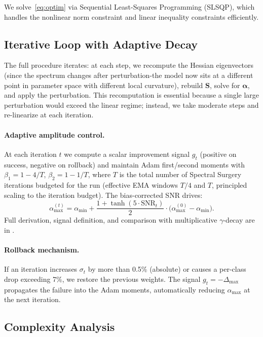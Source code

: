 \documentclass[11pt,a4paper]{article}
\newcommand{\mat}[1]{\bm{#1}}
\newcommand{\vect}[1]{\bm{#1}}
\begin{document}
We solve~\eqref{eq:optim} via Sequential Least-Squares Programming
(SLSQP), which handles the nonlinear norm constraint and linear
inequality constraints efficiently.

\subsection{Iterative Loop with Adaptive Decay}
\label{sec:loop}

The full procedure iterates: at each step, we recompute the Hessian
eigenvectors (since the spectrum changes after perturbation-the model
now sits at a different point in parameter space with different local
curvature), rebuild $\mat{S}$, solve for $\vect{\alpha}$, and apply
the perturbation. This recomputation is essential because a single
large perturbation would exceed the linear regime; instead, we take
moderate steps and re-linearize at each iteration.

\paragraph{Adaptive amplitude control.}
At each iteration $t$ we compute a scalar improvement signal $g_t$
(positive on success, negative on rollback) and maintain Adam
first/second moments with $\beta_1 = 1 - 4/T$, $\beta_2 = 1 - 1/T$,
where $T$ is the total number of Spectral Surgery iterations
budgeted for the run (effective EMA windows $T/4$ and $T$,
principled scaling to the iteration budget).
The bias-corrected SNR drives:
\begin{equation}
\alpha_{\max}^{(t)} = \alpha_{\min}
  + \frac{1 + \tanh(5 \cdot \mathrm{SNR}_t)}{2}
  \cdot \bigl(\alpha_{\max}^{(0)} - \alpha_{\min}\bigr).
\label{eq:adam-alpha}
\end{equation}
Full derivation, signal definition, and comparison with multiplicative
$\gamma$-decay are in .

\paragraph{Rollback mechanism.}
If an iteration increases $\sigma_t$ by more than 0.5\% (absolute)
or causes a per-class drop exceeding 7\%, we restore the previous
weights. The signal $g_t = -\Delta_{\max}$ propagates the failure
into the Adam moments, automatically reducing $\alpha_{\max}$ at the
next iteration.


\subsection{Complexity Analysis}
\end{document}

